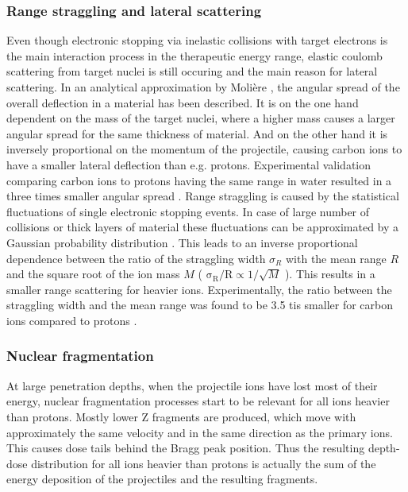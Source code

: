 \documentclass[type=dr, dr=rernat, accentcolor=tud7b,colorbacktitle, bigchapter, openright, twoside, 12pt ]{tudthesis}
\begin{document}
\subsubsection{Range straggling and lateral scattering}
\label{scat}
Even though electronic stopping via inelastic collisions with target electrons is the main interaction process in the therapeutic energy 
range, elastic coulomb scattering from target nuclei is still occuring and the main reason for lateral scattering. In an analytical 
approximation by Molière \cite{Mol48}, the angular spread of the overall deflection in a material has been described. It is 
on the one hand dependent on the mass of the target nuclei, where a higher mass causes a larger angular spread for the same thickness 
of material. And on the other hand it is inversely proportional on the momentum of the projectile, causing carbon ions to have a smaller 
lateral deflection than e.g. protons. Experimental validation comparing carbon ions to protons having the same range in water resulted 
in a three times smaller angular spread \cite{Sch10} \cite{Ric12}.\newline
\newline
Range straggling is caused by the statistical fluctuations of single electronic stopping events. In case of large number of collisions or 
thick layers of material these fluctuations can be approximated by a Gaussian probability distribution \cite{Bor40} 
\cite{Ahl80} \cite{Ric12}. This leads to an inverse proportional dependence between the ratio of the straggling width $\sigma_{R}$ with 
the mean range $R$ and the square root of the ion mass $M$ ( $\mathrm{\sigma_{R}}/\mathrm{R} \propto \mathrm{1}/{\sqrt{M}}$ ). This results 
in a smaller range scattering for heavier ions. Experimentally, the ratio between the straggling width and the mean range was found to be 
3.5 tis smaller for carbon ions compared to protons \cite{Sch10}.


\subsubsection{Nuclear fragmentation}

At large penetration depths, when the projectile ions have lost most of their energy, nuclear fragmentation processes start to be 
relevant for all ions heavier than protons. Mostly lower Z fragments are produced, which move with approximately the same velocity 
and in the same direction as the primary ions. This causes dose tails behind the Bragg peak position. Thus the resulting depth-dose 
distribution for all ions heavier than protons is actually the sum of the energy deposition of the projectiles and the resulting 
fragments. 
\end{document}
